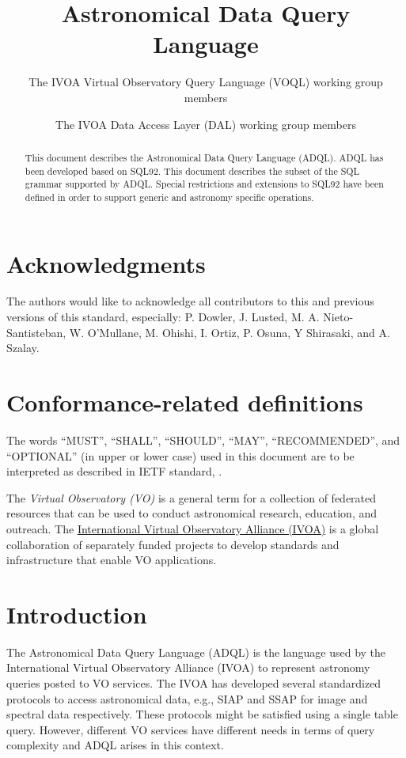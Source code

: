 \documentclass[11pt,a4paper]{ivoa}
\title{Astronomical Data Query Language}
\author[http://wiki.ivoa.net/twiki/bin/view/IVOA/IvoaVOQL]{The IVOA Virtual Observatory Query Language (VOQL) working group members}
\author[http://wiki.ivoa.net/twiki/bin/view/IVOA/IvoaDAL]{The IVOA Data Access Layer (DAL) working group members}
\begin{document}
\begin{abstract}
This document describes the Astronomical Data Query Language (ADQL).
ADQL has been developed based on SQL92.
This document describes the subset of the SQL grammar supported by ADQL.
Special restrictions and extensions to SQL92 have been defined in order
to support generic and astronomy specific operations.
\end{abstract}

\section*{Acknowledgments}

The authors would like to acknowledge all contributors to this and previous 
versions of this standard, especially:
P. Dowler,
J. Lusted,
M. A. Nieto-Santisteban,
W. O'Mullane,
M. Ohishi,
I. Ortiz,
P. Osuna,
Y Shirasaki,
and
A. Szalay.

\section*{Conformance-related definitions}

The words ``MUST'', ``SHALL'', ``SHOULD'', ``MAY'', ``RECOMMENDED'', and
``OPTIONAL'' (in upper or lower case) used in this document are to be
interpreted as described in IETF standard, \citet{std:RFC2119}.

The \emph{Virtual Observatory (VO)} is a general term for a collection of
federated resources that can be used to conduct astronomical research,
education, and outreach. The \href{http://www.ivoa.net}{International Virtual
Observatory Alliance (IVOA)} is a global collaboration of separately funded
projects to develop standards and infrastructure that enable VO applications.

\clearpage
\section{Introduction}
\label{sec:introduction}

The Astronomical Data Query Language (ADQL) is the language used by the
International Virtual Observatory Alliance (IVOA) to represent astronomy
queries posted to VO services. The IVOA has developed several standardized
protocols to access astronomical data, e.g., SIAP and SSAP for image and
spectral data respectively. These protocols might be satisfied using a single
table query. However, different VO services have different needs in terms
of query complexity and ADQL arises in this context.
\end{document}
